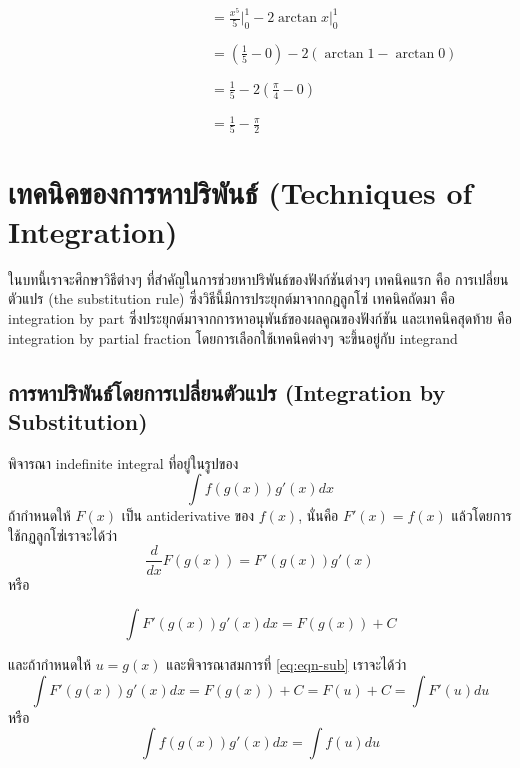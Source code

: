 \documentclass[
]{book}
\theoremstyle{definition}
\theoremstyle{definition}
\theoremstyle{definition}
\theoremstyle{definition}
\theoremstyle{remark}
\begin{document}
\(\qquad \qquad \qquad \qquad \qquad \qquad \qquad \ \ =\displaystyle
\frac{x^{5}}{5} \bigg |_{0}^{1}-2 \arctan x \bigg |_{0}^{1}\)

\(\qquad \qquad \qquad \qquad \qquad \qquad \qquad \ \ = \displaystyle \left(
\frac{1}{5} - 0 \right) - 2 \left( \arctan 1 - \arctan 0 \right)\)

\(\qquad \qquad \qquad \qquad \qquad \qquad \qquad \ \ =\displaystyle
\frac{1}{5}-2 \left( \frac{ \pi }{4}-0 \right)\)

\(\qquad \qquad \qquad \qquad \qquad \qquad \qquad \ \ =\displaystyle
\frac{1}{5}- \frac{ \pi }{2}\)

\chapter{เทคนิคของการหาปริพันธ์ (Techniques of Integration)}\label{uxe40uxe17uxe04uxe19uxe04uxe02uxe2duxe07uxe01uxe32uxe23uxe2buxe32uxe1buxe23uxe1euxe19uxe18-techniques-of-integration}

ในบทนี้เราจะศึกษาวิธีต่างๆ ที่สำคัญในการช่วยหาปริพันธ์ของฟังก์ชันต่างๆ เทคนิคแรก คือ
การเปลี่ยนตัวแปร (the substitution rule) ซึ่งวิธีนี้มีการประยุกต์มาจากกฎลูกโซ่
เทคนิคถัดมา คือ integration by part ซึ่งประยุกต์มาจากการหาอนุพันธ์ของผลคูณของฟังก์ชัน
และเทคนิคสุดท้าย คือ integration by partial fraction โดยการเลือกใช้เทคนิคต่างๆ
จะขึ้นอยู่กับ integrand

\section{การหาปริพันธ์โดยการเปลี่ยนตัวแปร (Integration by Substitution)}\label{uxe01uxe32uxe23uxe2buxe32uxe1buxe23uxe1euxe19uxe18uxe42uxe14uxe22uxe01uxe32uxe23uxe40uxe1buxe25uxe22uxe19uxe15uxe27uxe41uxe1buxe23-integration-by-substitution}

พิจารณา indefinite integral ที่อยู่ในรูปของ \[\int f(g(x))g'(x) dx\] ถ้ากำหนดให้
\(F(x)\) เป็น antiderivative ของ \(f(x)\), นั่นคือ \(F'(x) = f(x)\)
แล้วโดยการใช้กฏลูกโซ่เราจะได้ว่า \[\frac{d}{dx} F(g(x)) = F'(g(x)) g'(x)\] หรือ

\begin{equation}    
    \int F'(g(x)) g'(x) dx = F(g(x)) + C
    \label{eq:eqn-sub}
\end{equation}

และถ้ากำหนดให้ \(u = g(x)\) และพิจารณาสมการที่ \eqref{eq:eqn-sub} เราจะได้ว่า
\[\int F'(g(x)) g'(x) dx = F(g(x)) + C = F(u) + C = \int F'(u) du\] หรือ
\[\int f(g(x))g'(x) dx  = \int f(u) du\]
\end{document}
